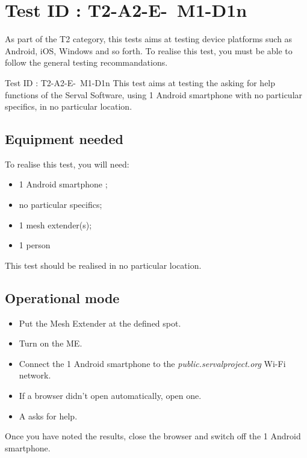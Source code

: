 \documentclass[oneside]{book}
\begin{document}
\section{Test ID : T2-A2-E- M1-D1n}
\begin{itshape}
As part of the T2 category, this tests aims at testing device platforms such as Android, iOS, Windows and so forth.
To realise this test, you must be able to follow the general testing recommandations.
\end{itshape}
\newline
Test ID : T2-A2-E- M1-D1n
 This test aims at testing the asking for help functions of the Serval Software, using 1 Android smartphone with no particular specifics, in no particular location.
\subsection{Equipment needed} To realise this test, you will need:
\begin{itemize}
\item 1 Android smartphone ;
\item no particular specifics;
\item 1 mesh extender(s);
\item 1 person
\end{itemize}
This test should be realised in no particular location.
\subsection{Operational mode} \begin{itemize}
\item Put the Mesh Extender at the defined spot.
\item Turn on the ME.
\item Connect the 1 Android smartphone to the \emph{public.servalproject.org} Wi-Fi network.
\item If a browser didn't open automatically, open one.
\item A asks for help.
\end{itemize}
Once you have noted the results, close the browser and switch off the 1 Android smartphone.
\end{document}
